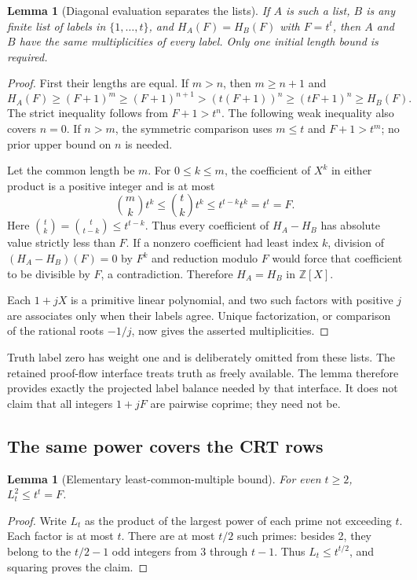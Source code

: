 \documentclass[11pt]{article}
\newtheorem{lemma}[theorem]{Lemma}
\theoremstyle{remark}\newtheorem{remark}[theorem]{Remark}
\newcommand{\Z}{\mathbb Z}\newcommand{\N}{\mathbb N}
\begin{document}
\begin{lemma}[Diagonal evaluation separates the lists]\label{lem:labels}
If $A$ is such a list, $B$ is any finite list of labels in
$\{1,\ldots,t\}$, and $H_A(F)=H_B(F)$ with $F=t^t$, then $A$ and $B$
have the same multiplicities of every label. Only one initial length
bound is required.
\end{lemma}
\begin{proof}
First their lengths are equal. If $m>n$, then $m\ge n+1$ and
\[
 H_A(F)\ge(F+1)^m\ge(F+1)^{n+1}
       >(t(F+1))^n\ge(tF+1)^n\ge H_B(F).
\]
The strict inequality follows from $F+1>t^n$. The following weak
inequality also covers $n=0$. If $n>m$, the symmetric comparison uses
$m\le t$ and $F+1>t^m$; no prior upper bound on $n$ is needed.

Let the common length be $m$. For $0\le k\le m$, the coefficient of
$X^k$ in either product is a positive integer and is at most
\[
 \binom{m}{k}t^k\le\binom{t}{k}t^k
 \le t^{t-k}t^k=t^t=F.
\]
Here $\binom{t}{k}=\binom{t}{t-k}\le t^{t-k}$.
Thus every coefficient of $H_A-H_B$ has absolute value strictly less
than $F$. If a nonzero coefficient had least index $k$, division of
$(H_A-H_B)(F)=0$ by $F^k$ and reduction modulo $F$ would force that
coefficient to be divisible by $F$, a contradiction. Therefore
$H_A=H_B$ in $\Z[X]$.

Each $1+jX$ is a primitive linear polynomial, and two such factors with
positive $j$ are associates only when their labels agree. Unique
factorization, or comparison of the rational roots $-1/j$, now gives
the asserted multiplicities.
\end{proof}

Truth label zero has weight one and is deliberately omitted from these
lists. The retained proof-flow interface treats truth as freely available.
The lemma therefore provides exactly the projected label balance needed
by that interface. It does not claim that all integers $1+jF$ are pairwise
coprime; they need not be.

\subsection{The same power covers the CRT rows}

\begin{lemma}[Elementary least-common-multiple bound]\label{lem:lcm}
For even $t\ge2$, $L_t^2\le t^t=F$.
\end{lemma}
\begin{proof}
Write $L_t$ as the product of the largest power of each prime not
exceeding $t$. Each factor is at most $t$. There are at most $t/2$
such primes: besides 2, they belong to the $t/2-1$ odd integers from
3 through $t-1$. Thus $L_t\le t^{t/2}$, and squaring proves the claim.
\end{proof}
\end{document}
